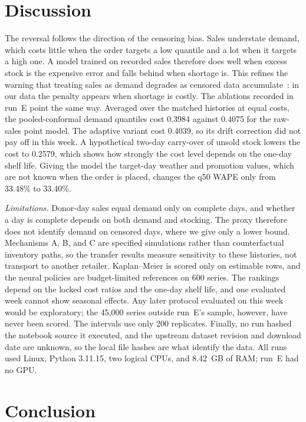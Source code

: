 \section{Discussion}
\label{sec:discussion}

The reversal follows the direction of the censoring bias. Sales understate demand, which costs little when the order targets a low quantile and a lot when it targets a high one. A model trained on recorded sales therefore does well when excess stock is the expensive error and falls behind when shortage is. This refines the warning that treating sales as demand degrades as censored data accumulate~\cite{kumar2026value}: in our data the penalty appears when shortage is costly. The ablations recorded in run~E point the same way. Averaged over the matched histories at equal costs, the pooled-conformal demand quantiles cost 0.3984 against 0.4075 for the raw-sales point model. The adaptive variant cost 0.4039, so its drift correction did not pay off in this week. A hypothetical two-day carry-over of unsold stock lowers the cost to 0.2579, which shows how strongly the cost level depends on the one-day shelf life. Giving the model the target-day weather and promotion values, which are not known when the order is placed, changes the q50 WAPE only from 33.48\% to 33.40\%.

\emph{Limitations.} Donor-day sales equal demand only on complete days, and whether a day is complete depends on both demand and stocking. The proxy therefore does not identify demand on censored days, where we give only a lower bound. Mechanisms A, B, and C are specified simulations rather than counterfactual inventory paths, so the transfer results measure sensitivity to these histories, not transport to another retailer. Kaplan--Meier is scored only on estimable rows, and the neural policies are budget-limited references on 600 series. The rankings depend on the locked cost ratios and the one-day shelf life, and one evaluated week cannot show seasonal effects. Any later protocol evaluated on this week would be exploratory; the 45,000 series outside run~E's sample, however, have never been scored. The intervals use only 200 replicates. Finally, no run hashed the notebook source it executed, and the upstream dataset revision and download date are unknown, so the local file hashes are what identify the data. All runs used Linux, Python 3.11.15, two logical CPUs, and 8.42~GB of RAM; run~E had no GPU.

\section{Conclusion}
\label{sec:conclusion}

